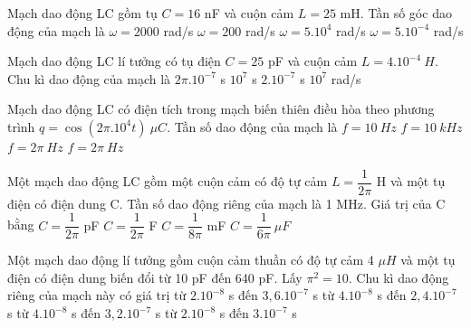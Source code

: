 \begin{vidu}%
Mạch dao động LC gồm tụ $C = 16$ nF và cuộn cảm $L = 25$ mH. Tần số góc dao động của mạch là
\choice
{$\omega  = 2000$ rad/s}
{$\omega  = 200$ rad/s}
{\True $\omega  = 5.10^4$ rad/s}
{$\omega  = 5.10^{-4}$ rad/s}
\end{vidu}
\begin{vidu}%
Mạch dao động LC lí tưởng có tụ điện $C = 25$ pF và cuộn cảm $L=4.10^{-4}\ H$. Chu kì dao động của mạch là
\choice
{\True $2\pi .10^{-7}$ s}
{$10^7$ s}
{$2.10^{-7}$ s}
{$10^7$  rad/s}
\end{vidu}
\begin{vidu}%
Mạch dao động LC có điện tích trong mạch biến thiên điều hòa theo phương trình $q=\cos({2\pi .10^4t})\ \mu C$. Tần số dao động của mạch là
\choice
{$f=10\ Hz$}
{\True $f=10\ kHz$}
{$f=2\pi \ Hz$}
{$f=2\pi \ Hz$}
\end{vidu}
\begin{vidu}%
Một mạch dao động LC gồm một cuộn cảm có độ tự cảm $L = \dfrac{1}{2\pi}$ H và một tụ điện có điện dung C. Tần số dao động riêng của mạch là 1 MHz. Giá trị của C bằng
\choice
{\True $C = \dfrac{1}{2\pi}$ pF}
{$C = \dfrac{1}{2\pi}$ F}
{$C = \dfrac{1}{8\pi}$ mF}
{$C = \dfrac{1}{6\pi}\ \mu F$}
\end{vidu}
\begin{vidu}%
 Một mạch dao động lí tưởng gồm cuộn cảm thuần có độ tự cảm 4 $\mu H$ và một tụ điện có điện dung biến đổi từ 10 pF đến 640 pF. Lấy $\pi ^2 = 10$. Chu kì dao động riêng của mạch này có giá trị
\choice
{từ $2.10^{-8}$ s đến $3,6.10^{-7}$ s}
{từ $4.10^{-8}$ s đến $2,4.10^{-7}$ s}
{\True từ $4.10^{-8}$ s đến $3,2.10^{-7}$ s}
{từ $2.10^{-8}$ s đến $3.10^{-7}$ s}
\end{vidu}
